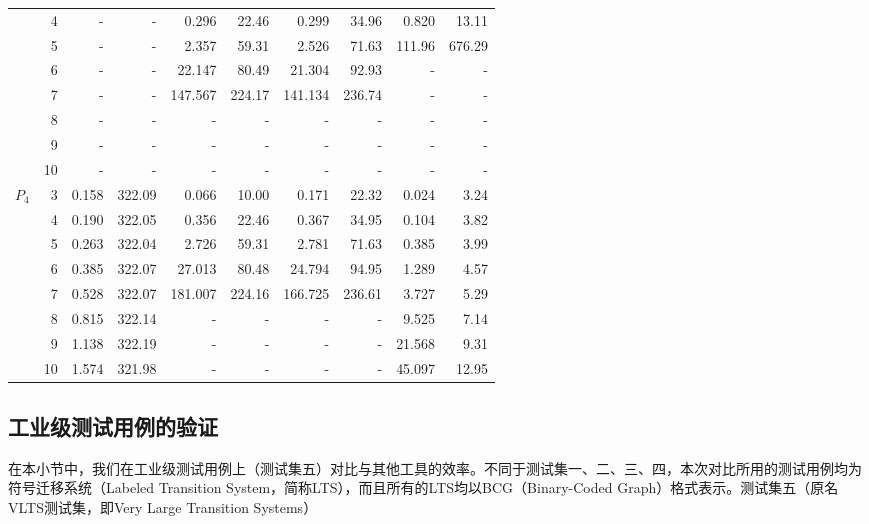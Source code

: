 \begin{table}[h!]
\begin{tabular}{| r | r | r | r | r | r | r | r | r | r |}
		{} & 4 & - & - & 0.296 & 22.46 & 0.299 & 34.96 & 0.820 & 13.11  \\
		{} & 5 & - & - & 2.357 & 59.31 & 2.526 & 71.63 & 111.96 & 676.29  \\
		{} & 6 & - & - & 22.147 & 80.49 & 21.304 & 92.93 & - & -  \\
		{} & 7 & - & - & 147.567 & 224.17 & 141.134 & 236.74 & - & -  \\
		{} & 8 & - & - & - & - & - & - & - & -  \\
		{} & 9 & - & - & - & - & - & - & - & -  \\
		{} & 10 & - & - & - & - & - & - & - & -  \\
		\hline
		\multirow{6}{*}{$P_4$} & 3 & 0.158 & 322.09 & 0.066 & 10.00 & 0.171 & 22.32 & 0.024 & 3.24  \\
		{} & 4 & 0.190 & 322.05 & 0.356 & 22.46 & 0.367 & 34.95 & 0.104 & 3.82  \\
		{} & 5 & 0.263 & 322.04 & 2.726 & 59.31 & 2.781 & 71.63 & 0.385 & 3.99  \\
		{} & 6 & 0.385 & 322.07 & 27.013 & 80.48 & 24.794 & 94.95 & 1.289 & 4.57  \\
		{} & 7 & 0.528 & 322.07 & 181.007 & 224.16 & 166.725 & 236.61 & 3.727 & 5.29  \\
		{} & 8 & 0.815 & 322.14 & - & - & - & - & 9.525 & 7.14  \\
		{} & 9 & 1.138 & 322.19 & - & - & - & - & 21.568 & 9.31  \\
		{} & 10 & 1.574 & 321.98 & - & - & - & - & 45.097 & 12.95  \\
		\hline
	\end{tabular}
	
	\label{tabl:data:ring}
\end{table}

\subsection{工业级测试用例的验证}	\label{subsc:vlts}
在本小节中，我们在工业级测试用例上（测试集五）对比\sctl{}与其他工具的效率。不同于测试集一、二、三、四，本次对比所用的测试用例均为符号迁移系统（Labeled Transition System，简称LTS），而且所有的LTS均以BCG（Binary-Coded Graph）格式表示。测试集五（原名VLTS测试集，即Very Large Transition Systems）

